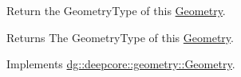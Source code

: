 Return the Geometry\+Type of this \hyperlink{structdg_1_1deepcore_1_1geometry_1_1_geometry}{Geometry}. 

\begin{DoxyReturn}{Returns}
The Geometry\+Type of this \hyperlink{structdg_1_1deepcore_1_1geometry_1_1_geometry}{Geometry}. 
\end{DoxyReturn}


Implements \hyperlink{group___geometry_module_gacdfc02ad835493ef40a398bdf24e30a1}{dg\+::deepcore\+::geometry\+::\+Geometry}.

